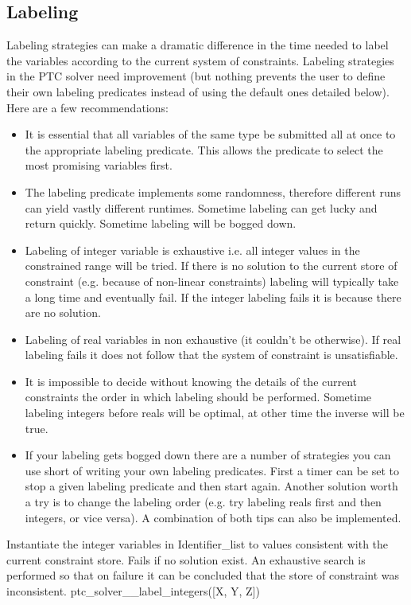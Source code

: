 \documentclass{article}
\begin{document}
\subsection{Labeling}
Labeling strategies can make a dramatic difference in the time needed to label
the variables according to the current system of constraints. Labeling strategies
in the PTC solver need improvement (but nothing prevents the user to define their
own labeling predicates instead of using the default ones detailed below). Here
are a few recommendations:
\begin{itemize}
\item It is essential that all variables of the same type be submitted all at
once to the appropriate labeling predicate. This allows the predicate to select
the most promising variables first.
\item The labeling predicate implements some randomness, therefore different runs
can yield vastly different runtimes. Sometime labeling can get lucky and return
quickly. Sometime labeling will be bogged down.
\item Labeling of integer variable is exhaustive i.e. all integer values in the
constrained range will be tried. If there is no solution to the current store of
constraint (e.g. because of non-linear constraints) labeling will typically take
a long time and eventually fail. If the integer labeling fails it is because
there are no solution.
\item Labeling of real variables in non exhaustive (it couldn't be otherwise). If
real labeling fails it does not follow that the system of constraint is
unsatisfiable.
\item It is impossible to decide without knowing the details of the current
constraints the order in which labeling should be performed. Sometime labeling
integers before reals will be optimal, at other time the inverse will be true.
\item If your labeling gets bogged down there are a number of strategies you can
use short of writing your own labeling predicates. First a timer can be set to
stop a given labeling predicate and then start again. Another solution worth a
try is to change the labeling order (e.g. try labeling reals first and then
integers, or vice versa). A combination of both tips can also be implemented.
\end{itemize}


    {Instantiate the integer variables in Identifier\_list to values
consistent with
    the current constraint store. Fails if no solution exist. An exhaustive
search is performed so that on failure it can be concluded that the store
of constraint was inconsistent.}
    {ptc\_solver\_\_label\_integers([X, Y, Z])}
    {}
\end{document}
